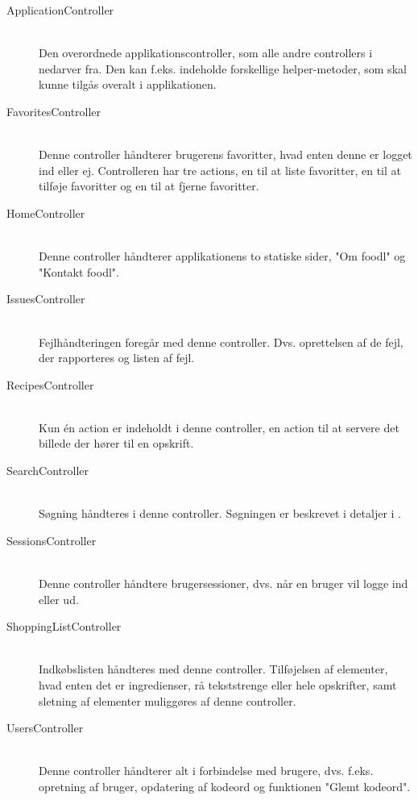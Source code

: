 \begin{description}
  \item[ApplicationController] \hfill \\ 
  Den overordnede applikationscontroller, som alle andre controllers i \Foodl{} nedarver fra. Den kan f.eks. indeholde forskellige helper-metoder, som skal kunne tilgås overalt i applikationen.

  \item[FavoritesController] \hfill \\ 
  Denne controller håndterer brugerens favoritter, hvad enten denne er logget ind eller ej. Controlleren har tre actions, en til at liste favoritter, en til at tilføje favoritter og en til at fjerne favoritter.

  \item[HomeController] \hfill \\ 
  Denne controller håndterer applikationens to statiske sider, "Om foodl" og "Kontakt foodl".

  \item[IssuesController] \hfill \\ 
  Fejlhåndteringen foregår med denne controller. Dvs. oprettelsen af de fejl, der rapporteres og listen af fejl.

  \item[RecipesController] \hfill \\
  Kun én action er indeholdt i denne controller, en action til at servere det billede der hører til en opskrift.

  \item[SearchController] \hfill \\
  Søgning håndteres i denne controller. Søgningen er beskrevet i detaljer i .

  \item[SessionsController] \hfill \\
  Denne controller håndtere brugersessioner, dvs. når en bruger vil logge ind eller ud.

  \item[ShoppingListController] \hfill \\
  Indkøbslisten håndteres med denne controller. Tilføjelsen af elementer, hvad enten det er ingredienser, rå tekststrenge eller hele opskrifter, samt sletning af elementer muliggøres af denne controller.

  \item[UsersController] \hfill \\
  Denne controller håndterer alt i forbindelse med brugere, dvs. f.eks. opretning af bruger, opdatering af kodeord og funktionen "Glemt kodeord".

\end{description}

